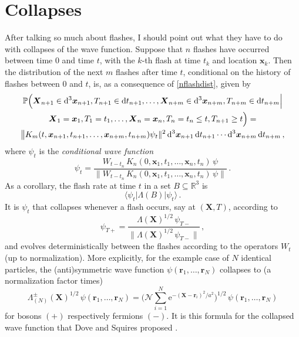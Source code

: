 \documentclass[12pt]{article}
\newcommand{\RRR}{\mathbb{R}}
\newcommand{\PPP}{\mathbb{P}}
\newcommand{\vx}{\boldsymbol{x}}
\newcommand{\vr}{\boldsymbol{r}}
\newcommand{\vX}{{\boldsymbol{X}}}
\newcommand{\D}{\mathrm{d}} %
\newcommand{\E}{\mathrm{e}} %
\newcommand{\1}{1}
\newcommand{\K}{K}
\newcommand{\nconst}{\mathcal{N}}
\newcommand{\z}[1]{{#1}}
\begin{document}
\section{Collapses}\label{sec:collapses}

After talking so much about flashes, I should point out what they have to do with collapses of the wave function. Suppose that $n$ flashes have occurred between time $0$ and time $t$, with the $k$-th flash at time $t_k$ and location $\vx_k$. Then the distribution of the next $m$ flashes after time $t$, conditional on the history of flashes between $0$ and $t$, is, as a consequence of  \eqref{nflashdist}, given by
\begin{multline}\label{condflashdist}
  \PPP \Bigl( \vX_{n+1} \in \D^3 \vx_{n+1}, T_{n+1} \in \D t_{n+1}, \ldots,
  \vX_{n+m} \in \D^3 \vx_{n+m}, T_{n+m} \in \D t_{n+m} \Big|\\
  \vX_1 = \vx_1, T_1 = t_1, \ldots, \vX_n = \vx_n, T_n = t_n\leq t, T_{n+1}\geq t \Bigr) =\\
  \bigl \| \K_m(t, \vx_{n+1}, t_{n+1}, \ldots, \vx_{n+m},t_{n+m}) \psi_t \|^2 \,
  \D^3 \vx_{n+1} \, \D t_{n+1} \cdots \D^3 \vx_{n+m} \, \D t_{n+m} \,,
\end{multline}
where $\psi_t$ is the \emph{conditional wave function}
\begin{equation}\label{condpsidef}
  \psi_t = \frac{ W_{t-t_n} \, \K_n (0,\vx_1,t_1, \ldots, \vx_n,t_n) \, \psi }
  {\| W_{t-t_n} \, \K_n (0,\vx_1,t_1, \ldots, \vx_n,t_n) \, \psi \|} \,.
\end{equation}
\z{As a corollary, the flash rate at time $t$ in a set $B \subseteq \RRR^3$ is}
\begin{equation}\label{rateBt}
  \langle \psi_t | \Lambda (B)| \psi_t \rangle\,.
\end{equation}
It is $\psi_t$ that collapses whenever a flash occurs, say at $(\vX,T)$, according to
\begin{equation}\label{collapse}
  \psi_{T+} = \frac{\Lambda(\vX)^{1/2} \, \psi_{T-}} 
  {\|\Lambda(\vX)^{1/2} \, \psi_{T-} \|} \,,
\end{equation}
and evolves deterministically between the flashes according to the operators $W_t$ (up to normalization). \z{More explicitly, for the example case of $N$ identical particles, the (anti)symmetric wave function $\psi(\vr_1, \ldots, \vr_N)$ collapses to (a normalization factor times)}
\begin{equation}
  \Lambda_{(N)}^{\pm}(\vX)^{1/2} \, \psi(\vr_1, \ldots, \vr_N) = \biggl(
  \nconst \sum_{i=1}^N  
  \E^{-(\vX - \vr_i)^2/a^2} \biggr)^{1/2} \, \psi(\vr_1, \ldots, \vr_N)
\end{equation}
\z{for bosons $(+)$ respectively fermions $(-)$. It is this formula for the collapsed wave function that Dove and Squires proposed \cite{DS95}.}
\end{document}

